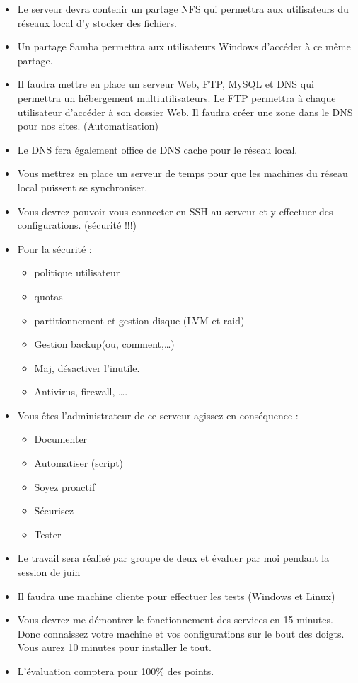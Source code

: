 \documentclass{article}
\begin{document}
	\begin{itemize}
		\item Le serveur devra contenir un partage NFS qui permettra aux utilisateurs du réseaux local d’y stocker des fichiers.
		\item Un partage Samba permettra aux utilisateurs Windows d’accéder à ce même partage.
		\item Il faudra mettre en place un serveur Web, FTP, MySQL et DNS qui permettra un hébergement multiutilisateurs. Le FTP permettra à chaque utilisateur d’accéder à son dossier Web. Il faudra créer une zone dans le DNS pour nos sites. (Automatisation)
		\item Le DNS fera également office de DNS cache pour le réseau local.
		\item Vous mettrez en place un serveur de temps pour que les machines du réseau local puissent se synchroniser.
		\item Vous devrez pouvoir vous connecter en SSH au serveur et y effectuer des configurations. (sécurité !!!)
		\item Pour la sécurité :
		\begin{itemize}
			\item politique utilisateur
			\item quotas
			\item partitionnement et gestion disque (LVM et raid)
			\item Gestion backup(ou, comment,…)
			\item Maj, désactiver l’inutile.
			\item Antivirus, firewall, ….
		\end{itemize}
		\newpage
		\item Vous êtes l’administrateur de ce serveur agissez en conséquence :
		\begin{itemize}
			\item Documenter
			\item Automatiser (script)
			\item Soyez proactif
			\item Sécurisez
			\item Tester
		\end{itemize}
		\item Le travail sera réalisé par groupe de deux et évaluer par moi pendant la session de juin
		\item Il faudra une machine cliente pour effectuer les tests (Windows et Linux)
		\item Vous devrez me démontrer le fonctionnement des services en 15 minutes. Donc connaissez votre machine et vos configurations sur le bout des doigts. Vous aurez 10 minutes pour installer le tout.
		\item L’évaluation comptera pour 100\% des points. 
		
	\end{itemize}
	
\end{document}
